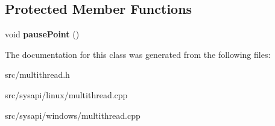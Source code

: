 \subsection*{\-Protected \-Member \-Functions}
\begin{DoxyCompactItemize}
\item 
\hypertarget{classthread__t_a54c18c0e0bb66666fd3bfab3f1a1f1c8}{void {\bfseries pause\-Point} ()}\label{classthread__t_a54c18c0e0bb66666fd3bfab3f1a1f1c8}

\end{DoxyCompactItemize}


\-The documentation for this class was generated from the following files\-:\begin{DoxyCompactItemize}
\item 
src/multithread.\-h\item 
src/sysapi/linux/multithread.\-cpp\item 
src/sysapi/windows/multithread.\-cpp\end{DoxyCompactItemize}
